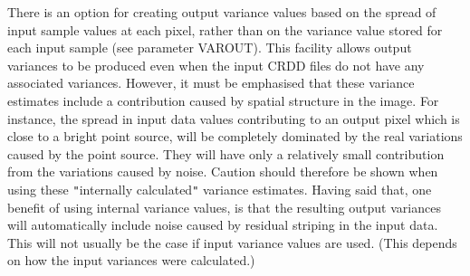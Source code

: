 \begin{small}
{{      There is an option for creating output variance values based on
      the spread of input sample values at each pixel, rather than on
      the variance value stored for each input sample (see parameter
      VAROUT).  This facility allows output variances to be produced
      even when the input CRDD files do not have any associated
      variances. However, it must be emphasised that these variance
      estimates include a contribution caused by spatial structure in
      the image. For instance, the spread in input data values
      contributing to an output pixel which is close to a bright point
      source, will be completely dominated by the real variations
      caused by the point source. They will have only a relatively
      small contribution from the variations caused by noise. Caution
      should therefore be shown when using these {\tt "}internally
      calculated{\tt "} variance estimates.  Having said that, one benefit of
      using internal variance values, is that the resulting output
      variances will automatically include noise caused by residual
      striping in the input data. This will not usually be the case if
      input variance values are used. (This depends on how the input
      variances were calculated.)
   }
}


\end{small}
